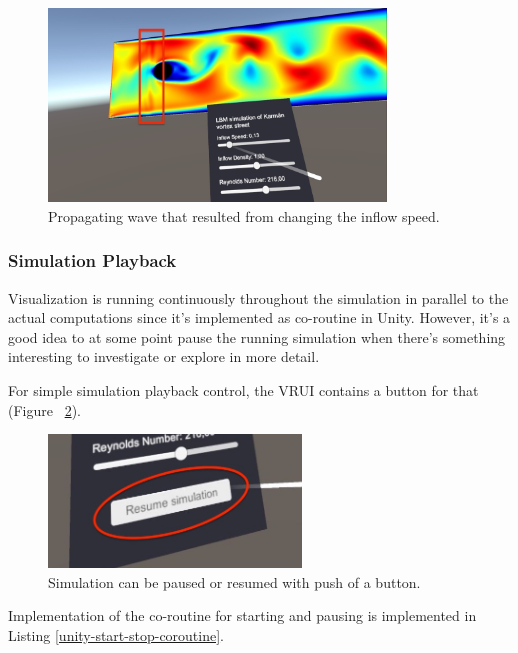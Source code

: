 \begin{figure}[!ht]
	\centering
	\includegraphics[width=0.8\textwidth]{figures/inflow-speed-change.jpeg}
	\caption{Propagating wave that resulted from changing the inflow speed.}
	\label{fig:wave-propagation}
\end{figure}

\subsubsection{Simulation Playback}\label{sec:sim-playback}

Visualization is running continuously throughout the simulation in parallel to the actual computations since it's implemented as co-routine in Unity. However, it's a good idea to at some point pause the running simulation when there's something interesting to investigate or explore in more detail.

For simple simulation playback control, the VRUI contains a button for that (Figure~ \ref{fig:unity-pause-play}).

\begin{figure}[!ht]
	\centering
	\includegraphics[width=0.6\textwidth]{figures/playback-button.jpeg}
	\caption{Simulation can be paused or resumed with push of a button.}
	\label{fig:unity-pause-play}
\end{figure}

Implementation of the co-routine for starting and pausing is implemented in Listing \ref{unity-start-stop-coroutine}.


